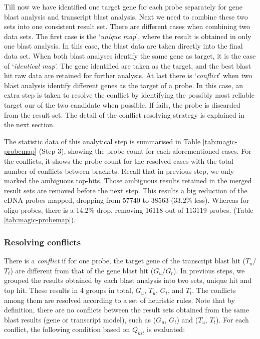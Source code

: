 Till now we have identified one target gene for each probe separately for gene 
blast analysis and transcript blast analysis. 
Next we need to combine these two sets into one consistent result set. 
%
There are different cases when combining two data sets. 
The first case is the `\textit{unique map}', where the result is obtained in 
only one blast analysis. In this case, the blast data are taken directly into 
the final data set.
%
When both blast analyses identify the same gene as target, it is the case of 
`\textit{identical map}'. The gene identified are taken as the target, and the 
best blast hit raw data are retained for further analysis.
%
At last there is `\textit{conflict}' when two blast analysis identify 
different genes as the target of a probe.  
In this case, an extra step is taken to resolve the conflict by identifying the 
possibly most reliable target our of the two candidate when possible. If fails, 
the probe is discarded from the result set.
The detail of the conflict resolving strategy is explained in the next section.

The statistic data of this analytical step is summarised in Table 
\ref{tab:magic-probemap} (Step 3), showing the probe count for each 
aforementioned cases.
For the conflicts, it shows the probe count for the resolved cases with 
the total number of conflicts between brackets.
%
Recall that in previous step, we only marked the ambiguous top-hits. Those 
ambiguous results retained in the merged result sets are removed before the 
next step.
This results a big reduction of the cDNA probes mapped, dropping from 57740 to 
38563 (33.2\% less). Whereas for oligo probes, there is a 14.2\% drop, 
removing 16118 out of 113119 probes. (Table \ref{tab:magic-probemap}).


\subsubsection{Resolving conflicts}\label{apd:magic-conflict}

There is a \textit{conflict} if for one probe, the target gene of the 
transcript blast hit ($T_u$/$T_t$) are different from that of the gene blast 
hit ($G_u$/$G_t$). 
In previous steps, we grouped the results obtained by each blast analysis into 
two sets, unique hit and top hit. These results in 4 groups in total, $G_u$, 
$T_u$, $G_t$, and $T_t$.
The conflicts among them are resolved according to a set of heuristic rules. 
Note that by definition, there are no conflicts between the result sets 
obtained from the same blast results (gene or transcript model), such as 
($G_u$, $G_t$) and ($T_u$, $T_t$). 
For each conflict, the following condition based on $Q_{hit}$ is evaluated: 

